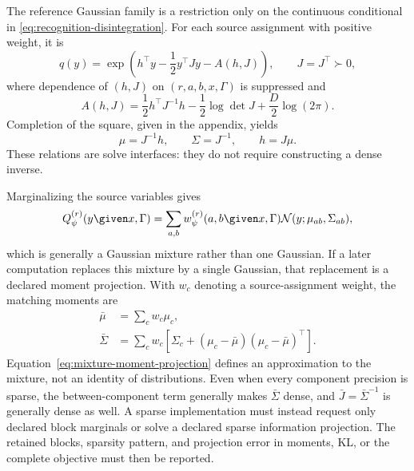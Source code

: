 The reference Gaussian family is a restriction only on the continuous conditional in \cref{eq:recognition-disintegration}.  For each source assignment with positive weight, it is
\begin{equation}
q(y)
=\exp\left(
h^\top y-\frac12y^\top Jy-A(h,J)
\right),
\qquad
J=J^\top\succ0,
\label{eq:joint-gaussian-information-form}
\end{equation}
where dependence of $(h,J)$ on $(r,a,b,x,\Gamma)$ is suppressed and
\begin{equation}
A(h,J)
=\frac12h^\top J^{-1}h
-\frac12\log\det J
+\frac D2\log(2\pi).
\label{eq:gaussian-log-normalizer}
\end{equation}
Completion of the square, given in the appendix, yields
\begin{equation}
\mu=J^{-1}h,
\qquad
\Sigma=J^{-1},
\qquad
h=J\mu.
\label{eq:information-moment-conversion}
\end{equation}
These relations are solve interfaces: they do not require constructing a dense inverse.

Marginalizing the source variables gives
\begin{equation}
Q_\psi^{(r)}(y\given x,\Gamma)
=\sum_{a,b}w_\psi^{(r)}(a,b\given x,\Gamma)
\mathcal N(y;\mu_{ab},\Sigma_{ab}),
\label{eq:source-marginal-gaussian-mixture}
\end{equation}
which is generally a Gaussian mixture rather than one Gaussian.  If a later computation replaces this mixture by a single Gaussian, that replacement is a declared moment projection.  With $w_c$ denoting a source-assignment weight, the matching moments are
\begin{equation}
\begin{aligned}
\bar\mu&=\sum_cw_c\mu_c,\\
\bar\Sigma&=\sum_cw_c
\left[
\Sigma_c+(\mu_c-\bar\mu)(\mu_c-\bar\mu)^\top
\right].
\end{aligned}
\label{eq:mixture-moment-projection}
\end{equation}
Equation~\eqref{eq:mixture-moment-projection} defines an approximation to the mixture, not an identity of distributions. Even when every component precision is sparse, the between-component term generally makes $\bar\Sigma$ dense, and $\bar J=\bar\Sigma^{-1}$ is generally dense as well. A sparse implementation must instead request only declared block marginals or solve a declared sparse information projection. The retained blocks, sparsity pattern, and projection error in moments, KL, or the complete objective must then be reported.

